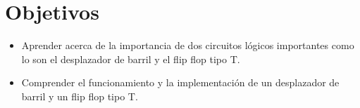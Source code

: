 \section{Objetivos \label{sec:obj}}


\begin{itemize} 
	\item Aprender acerca de la importancia de dos circuitos lógicos importantes como lo son el desplazador de barril y el flip flop tipo T.
	
	\item Comprender el funcionamiento y la implementación de un desplazador de barril y un flip flop tipo T.
\end{itemize}